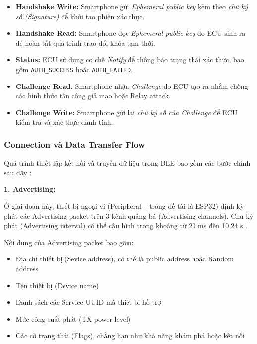 \begin{itemize}
    \item \textbf{Handshake Write:} Smartphone gửi \emph{Ephemeral public key} kèm theo \emph{chữ ký số (Signature)} để khởi tạo phiên xác thực.
    
    \item \textbf{Handshake Read:} Smartphone đọc \emph{Ephemeral public key} do ECU sinh ra để hoàn tất quá trình trao đổi khóa tạm thời.

    \item \textbf{Status:} ECU sử dụng cơ chế \emph{Notify} để thông báo trạng  thái xác thực, bao gồm \texttt{AUTH\_SUCCESS} hoặc \texttt{AUTH\_FAILED}.

    \item \textbf{Challenge Read:} Smartphone nhận \emph{Challenge} do ECU tạo ra nhằm chống các hình thức tấn công giả mạo hoặc Relay attack.

    \item \textbf{Challenge Write:} Smartphone gửi lại \emph{chữ ký số của Challenge} để ECU kiểm tra và xác thực danh tính.
\end{itemize}

\subsubsection{Connection và Data Transfer Flow}

Quá trình thiết lập kết nối và truyền dữ liệu trong BLE bao gồm các bước chính sau đây \cite{townsend2014getting}:

\medskip
\par\vspace{0.5em}
\textbf{1. Advertising:}
\par\vspace{0.3em}
Ở giai đoạn này, thiết bị ngoại vi (Peripheral – trong đề tài là ESP32) định kỳ phát các Advertising packet trên 3 kênh quảng bá (Advertising channels).
Chu kỳ phát (Advertising interval) có thể cấu hình trong khoảng từ 20 ms đến 10.24 s \cite{bluetooth40,ble_core}.

Nội dung của Advertising packet bao gồm:
\begin{itemize}
\item Địa chỉ thiết bị (Sevice address), có thể là public address hoặc Random address
\item Tên thiết bị (Device name)
\item Danh sách các Service UUID mà thiết bị hỗ trợ
\item Mức công suất phát (TX power level)
\item Các cờ trạng thái (Flags), chẳng hạn như khả năng khám phá hoặc kết nối
\end{itemize}

